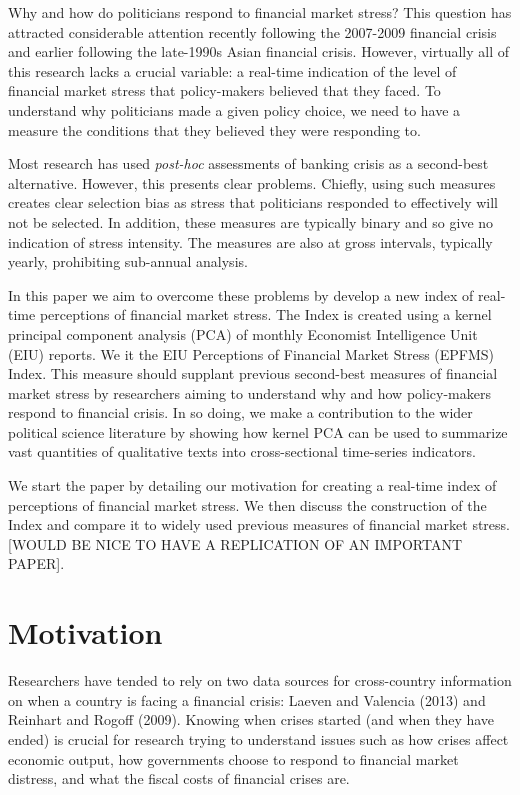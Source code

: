\documentclass[]{article}
\begin{document}
Why and how do politicians respond to financial market stress? This
question has attracted considerable attention recently following the
2007-2009 financial crisis and earlier following the late-1990s Asian
financial crisis. However, virtually all of this research lacks a
crucial variable: a real-time indication of the level of financial
market stress that policy-makers believed that they faced. To understand
why politicians made a given policy choice, we need to have a measure
the conditions that they believed they were responding to.

Most research has used \emph{post-hoc} assessments of banking crisis as
a second-best alternative. However, this presents clear problems.
Chiefly, using such measures creates clear selection bias as stress that
politicians responded to effectively will not be selected. In addition,
these measures are typically binary and so give no indication of stress
intensity. The measures are also at gross intervals, typically yearly,
prohibiting sub-annual analysis.

In this paper we aim to overcome these problems by develop a new index
of real-time perceptions of financial market stress. The Index is
created using a kernel principal component analysis (PCA) of monthly
Economist Intelligence Unit (EIU) reports. We it the EIU Perceptions of
Financial Market Stress (EPFMS) Index. This measure should supplant
previous second-best measures of financial market stress by researchers
aiming to understand why and how policy-makers respond to financial
crisis. In so doing, we make a contribution to the wider political
science literature by showing how kernel PCA can be used to summarize
vast quantities of qualitative texts into cross-sectional time-series
indicators.

We start the paper by detailing our motivation for creating a real-time
index of perceptions of financial market stress. We then discuss the
construction of the Index and compare it to widely used previous
measures of financial market stress. {[}WOULD BE NICE TO HAVE A
REPLICATION OF AN IMPORTANT PAPER{]}.

\section{Motivation}\label{motivation}

Researchers have tended to rely on two data sources for cross-country
information on when a country is facing a financial crisis: Laeven and
Valencia (2013) and Reinhart and Rogoff (2009). Knowing when crises
started (and when they have ended) is crucial for research trying to
understand issues such as how crises affect economic output, how
governments choose to respond to financial market distress, and what the
fiscal costs of financial crises are.
\end{document}
